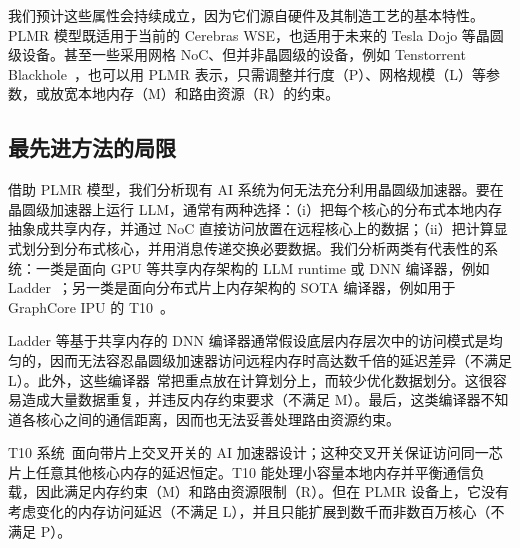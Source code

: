 我们预计这些属性会持续成立，因为它们源自硬件及其制造工艺的基本特性。PLMR 模型既适用于当前的 Cerebras WSE，也适用于未来的 Tesla Dojo 等晶圆级设备。甚至一些采用网格 NoC、但并非晶圆级的设备，例如 Tenstorrent Blackhole~\cite{tenstorrent}，也可以用 PLMR 表示，只需调整并行度（P）、网格规模（L）等参数，或放宽本地内存（M）和路由资源（R）的约束。

\vspace{-3mm}
\subsection{最先进方法的局限}
\vspace{-1mm}

借助 PLMR 模型，我们分析现有 AI 系统为何无法充分利用晶圆级加速器。要在晶圆级加速器上运行 LLM，通常有两种选择：（i）把每个核心的分布式本地内存抽象成共享内存，并通过 NoC 直接访问放置在远程核心上的数据；（ii）把计算显式划分到分布式核心，并用消息传递交换必要数据。我们分析两类有代表性的系统：一类是面向 GPU 等共享内存架构的 LLM runtime 或 DNN 编译器，例如 Ladder~\cite{ladder}；另一类是面向分布式片上内存架构的 SOTA 编译器，例如用于 GraphCore IPU 的 T10~\cite{t10}。

Ladder 等基于共享内存的 DNN 编译器通常假设底层内存层次中的访问模式是均匀的，因而无法容忍晶圆级加速器访问远程内存时高达数千倍的延迟差异（不满足 L）。此外，这些编译器~\cite{tvm,rammer,ansor,flextensor,roller,welder,ladder}常把重点放在计算划分上，而较少优化数据划分。这很容易造成大量数据重复，并违反内存约束要求（不满足 M）。最后，这类编译器不知道各核心之间的通信距离，因而也无法妥善处理路由资源约束。

 T10 系统~\cite{t10}面向带片上交叉开关的 AI 加速器设计；这种交叉开关保证访问同一芯片上任意其他核心内存的延迟恒定。T10 能处理小容量本地内存并平衡通信负载，因此满足内存约束（M）和路由资源限制（R）。但在 PLMR 设备上，它没有考虑变化的内存访问延迟（不满足 L），并且只能扩展到数千而非数百万核心（不满足 P）。

